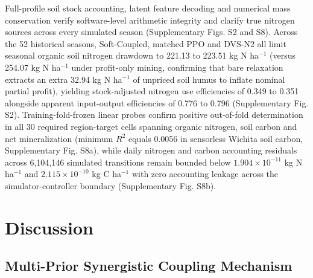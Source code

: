 \documentclass[11pt,a4paper]{article}
\begin{document}
Full-profile soil stock accounting, latent feature decoding and numerical mass conservation verify software-level arithmetic integrity and clarify true nitrogen sources across every simulated season (Supplementary Figs. S2 and S8). Across the 52 historical seasons, Soft-Coupled, matched PPO and DVS-N2 all limit seasonal organic soil nitrogen drawdown to 221.13 to 223.51 kg N ha$^{-1}$ (versus 254.07 kg N ha$^{-1}$ under profit-only mining, confirming that bare relaxation extracts an extra 32.94 kg N ha$^{-1}$ of unpriced soil humus to inflate nominal partial profit), yielding stock-adjusted nitrogen use efficiencies of 0.349 to 0.351 alongside apparent input-output efficiencies of 0.776 to 0.796 (Supplementary Fig. S2). Training-fold-frozen linear probes confirm positive out-of-fold determination in all 30 required region-target cells spanning organic nitrogen, soil carbon and net mineralization (minimum $R^2$ equals 0.0056 in sensorless Wichita soil carbon, Supplementary Fig. S8a), while daily nitrogen and carbon accounting residuals across 6,104,146 simulated transitions remain bounded below $1.904 \times 10^{-11}$ kg N ha$^{-1}$ and $2.115 \times 10^{-10}$ kg C ha$^{-1}$ with zero accounting leakage across the simulator-controller boundary (Supplementary Fig. S8b).

\FloatBarrier

\section{Discussion}

\subsection{Multi-Prior Synergistic Coupling Mechanism}
\end{document}
